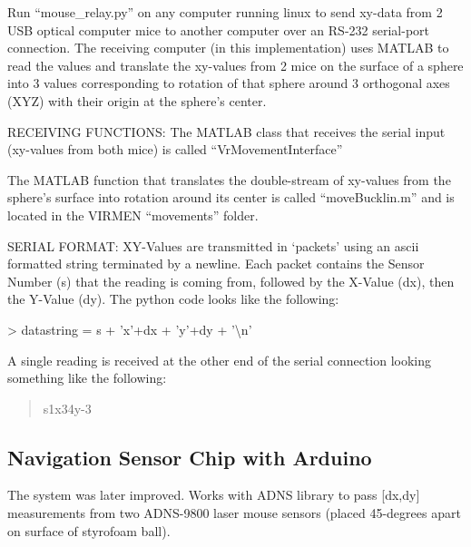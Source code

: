 \documentclass[
  12pt,
]{report}
\newenvironment{Shaded}{}{}
\newcommand{\CharTok}[1]{\textcolor[rgb]{0.25,0.44,0.63}{#1}}
\newcommand{\NormalTok}[1]{#1}
\newcommand{\OperatorTok}[1]{\textcolor[rgb]{0.40,0.40,0.40}{#1}}
\newcommand{\StringTok}[1]{\textcolor[rgb]{0.25,0.44,0.63}{#1}}
\numberwithin{figure}{section}
\numberwithin{table}{section}
\numberwithin{equations}{section}
\begin{document}
Run ``mouse\_relay.py'' on any computer running linux to send xy-data
from 2 USB optical computer mice to another computer over an RS-232
serial-port connection. The receiving computer (in this implementation)
uses MATLAB to read the values and translate the xy-values from 2 mice
on the surface of a sphere into 3 values corresponding to rotation of
that sphere around 3 orthogonal axes (XYZ) with their origin at the
sphere's center.

RECEIVING FUNCTIONS: The MATLAB class that receives the serial input
(xy-values from both mice) is called ``VrMovementInterface''

The MATLAB function that translates the double-stream of xy-values from
the sphere's surface into rotation around its center is called
``moveBucklin.m'' and is located in the VIRMEN ``movements'' folder.

SERIAL FORMAT: XY-Values are transmitted in `packets' using an ascii
formatted string terminated by a newline. Each packet contains the
Sensor Number (s) that the reading is coming from, followed by the
X-Value (dx), then the Y-Value (dy). The python code looks like the
following:

\begin{Shaded}
\begin{Highlighting}[]
\OperatorTok{>}\NormalTok{ datastring }\OperatorTok{=}\NormalTok{ s }\OperatorTok{+} \StringTok{'x'}\OperatorTok{+}\NormalTok{dx }\OperatorTok{+} \StringTok{'y'}\OperatorTok{+}\NormalTok{dy }\OperatorTok{+} \StringTok{'}\CharTok{\textbackslash{}n}\StringTok{'}
\end{Highlighting}
\end{Shaded}

A single reading is received at the other end of the serial connection
looking something like the following:

\begin{quote}
s1x34y-3
\end{quote}

\hypertarget{navigation-sensor-chip-with-arduino}{%
\subsection{Navigation Sensor Chip with
Arduino}\label{navigation-sensor-chip-with-arduino}}

The system was later improved. Works with ADNS library to pass
{[}dx,dy{]} measurements from two ADNS-9800 laser mouse sensors (placed
45-degrees apart on surface of styrofoam ball).
\end{document}
